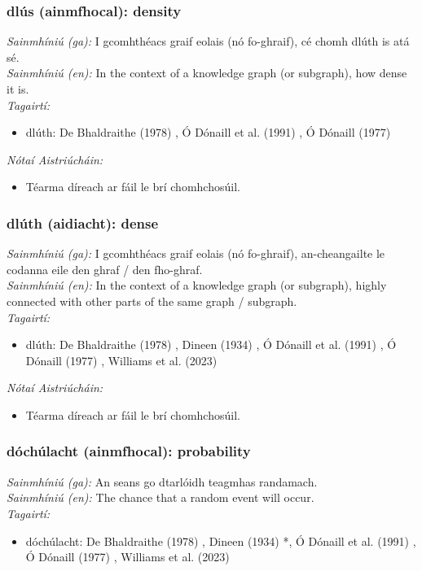 \documentclass{article}
\begin{document}
\subsubsection*{dlús (ainmfhocal): density}
 \noindent \textit{Sainmhíniú (ga):} I gcomhthéacs graif eolais (nó fo-ghraif), cé chomh dlúth is atá sé.
\\
 \noindent \textit{Sainmhíniú (en):} In the context of a knowledge graph (or subgraph), how dense it is.
\\
 \noindent \textit{Tagairtí:}
\begin{itemize}
	\item dlúth: De Bhaldraithe (1978) \cite{de-bhaldraithe}, Ó Dónaill et al. (1991) \cite{focloir-beag}, Ó Dónaill (1977) \cite{odonaill}
\end{itemize}

 \noindent \textit{Nótaí Aistriúcháin:}
\begin{itemize}
	\item Téarma díreach ar fáil le brí chomhchosúil.
\end{itemize}


\subsubsection*{dlúth (aidiacht): dense}
 \noindent \textit{Sainmhíniú (ga):} I gcomhthéacs graif eolais (nó fo-ghraif), an-cheangailte le codanna eile den ghraf / den fho-ghraf.
\\
 \noindent \textit{Sainmhíniú (en):} In the context of a knowledge graph (or subgraph), highly connected with other parts of the same graph / subgraph.
\\
 \noindent \textit{Tagairtí:}
\begin{itemize}
	\item dlúth: De Bhaldraithe (1978) \cite{de-bhaldraithe}, Dineen (1934) \cite{dineen}, Ó Dónaill et al. (1991) \cite{focloir-beag}, Ó Dónaill (1977) \cite{odonaill}, Williams et al. (2023) \cite{storchiste}
\end{itemize}

 \noindent \textit{Nótaí Aistriúcháin:}
\begin{itemize}
	\item Téarma díreach ar fáil le brí chomhchosúil.
\end{itemize}


\subsubsection*{dóchúlacht (ainmfhocal): probability}
 \noindent \textit{Sainmhíniú (ga):} An seans go dtarlóidh teagmhas randamach.
\\
 \noindent \textit{Sainmhíniú (en):} The chance that a random event will occur.
\\
 \noindent \textit{Tagairtí:}
\begin{itemize}
	\item dóchúlacht: De Bhaldraithe (1978) \cite{de-bhaldraithe}, Dineen (1934) \cite{dineen}*, Ó Dónaill et al. (1991) \cite{focloir-beag}, Ó Dónaill (1977) \cite{odonaill}, Williams et al. (2023) \cite{storchiste}
\end{itemize}
\end{document}
